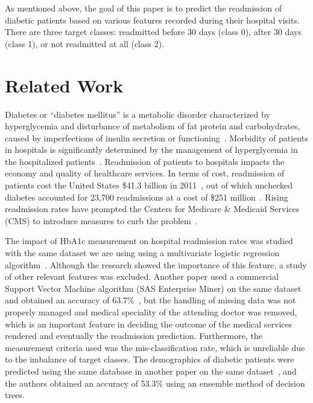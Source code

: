 \documentclass[conference]{IEEEtran}
\begin{document}
As mentioned above, the goal of this paper is to predict the readmission of diabetic patients based on various features recorded during their hospital visits. There are three target classes: readmitted before 30 days (class 0), after 30 days (class 1), or not readmitted at all (class 2).

\section{Related Work}

Diabetes or “diabetes mellitus” is a metabolic disorder characterized by hyperglycemia and disturbance of metabolism of fat protein and carbohydrates, caused by imperfections of insulin secretion or functioning~\cite{worldhealthorganization-2015}. Morbidity of patients in hospitals is significantly determined by the management of hyperglycemia in the hospitalized patients~\cite{hyperglycemia-2002, unrecognizeddiabetes-1998}. Readmission of patients to hospitals impacts the economy and quality of healthcare services. In terms of cost, readmission of patients cost the United States \$41.3 billion in 2011~\cite{estimates-2011}, out of which unchecked diabetes accounted for 23,700 readmissions at a cost of \$251 million~\cite{sas-2015}. Rising readmission rates have prompted the Centers for Medicare \& Medicaid Services (CMS) to introduce measures to curb the problem~\cite{readmissionreduction-2015}.

The impact of HbA1c measurement on hospital readmission rates was studied with the same dataset we are using using a multivariate logistic regression algorithm~\cite{hba1c-2014}. Although the research showed the importance of this feature, a study of other relevant features was excluded. Another paper used a commercial Support Vector Machine algorithm (SAS Enterprise Miner) on the same dataset and obtained an accuracy of 63.7\%~\cite{sas-2015}, but the handling of missing data was not properly managed and medical speciality of the attending doctor was removed, which is an important feature in deciding the outcome of the medical services rendered and eventually the readmission prediction. Furthermore, the measurement criteria used was the mis-classification rate, which is unreliable due to the imbalance of target classes. The demographics of diabetic patients were predicted using the same database in another paper on the same dataset~\cite{cotha-2015}, and the authors obtained an accuracy of 53.3\% using an ensemble method of decision trees.
\end{document}
